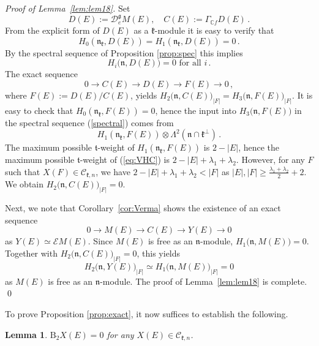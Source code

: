 \documentclass{tglat2e}
\newtheorem{lemma}[theorem]{Lemma}
\theoremstyle{definition}
\theoremstyle{remark}
\renewcommand{\tt}{\mathfrak{t}}
\newcommand{\kk}{\mathfrak{k}}
\newcommand{\nn}{\mathfrak{n}}
\renewcommand{\gg}{\mathfrak{g}}
\begin{document}
	\begin{proof}[Proof of Lemma~\ref{lem:lem18}] Set
$$D(E):=\mathcal D^\gg_e M(E),\quad C(E):=\Gamma_{\mathbb C  f}D(E)\,.$$
		From the explicit form of $D(E)$ as a $\kk$-module it is easy to verify that 
		\begin{equation*}
			H_0\left(\nn_\kk,D(E)\right)=H_1\left(\nn_\kk,D(E)\right)=0\,.
		\end{equation*}
		By the spectral sequence of Proposition \ref{prop:spec} this implies 
		\begin{equation*}
			H_i\big(\nn,D(E)\big)=0\text{ for all }i\,.
		\end{equation*}
		The exact sequence
		\begin{equation*}
			0\to C(E)\to D(E)\to F(E)\to 0\,,
		\end{equation*}
		where $F(E):=D(E)/C(E)$, yields $H_2\big(\nn,C(E)\big)_{|F|}=H_3\big(\nn,F(E)\big)_{|F|}$.  It is easy to check that $H_0\left(\nn_\kk,F(E)\right)=0$, hence the input 
into $H_3\big(\nn,F(E)\big)$ in the spectral sequence (\ref{spectral}) comes from 
		\begin{equation}
			H_1\left(\nn_\kk,F(E)\right)\otimes\Lambda^2\left(\nn\cap\kk^\perp\right)\,.
			\label{eq:VHC}
		\end{equation}
		The maximum possible $\tt$-weight of $H_1\left(\nn_\kk,F(E)\right)$ is $2-|E|$, hence the maximum possible $\tt$-weight of (\ref{eq:VHC}) is $2-|E|+\lambda_1+\lambda_2$.  However, for any $F$ such that $X(F)\in \mathcal{C}_{\kk,n}$, we have $2-|E|+\lambda_1+\lambda_2<|F|$ as $|E|,|F|\geq \frac{\lambda_1+\lambda_2}{2}+2$.  We obtain $H_2\big(\nn,C(E)\big)_{|F|}=0$.  
		
		Next, we note that Corollary~\ref{cor:Verma} shows the existence of an exact sequence
		$$0\to M(E)\to C(E)\to Y(E)\to 0$$
		as $Y(E)\simeq \mathcal{E}M(E)$.  Since $M(E)$ is free as an $\nn$-module, $H_1\big(\nn,M(E)\big)=0$.  Together with $H_2\big(\nn,C(E)\big)_{|F|}=0$, this yields
		\begin{equation*}
			H_2\big(\nn,Y(E)\big)_{|F|}\simeq H_1\big(\nn,M(E)\big)_{|F|}=0
		\end{equation*}
		as $M(E)$ is free as an $\nn$-module.  The proof of Lemma~\ref{lem:lem18} is complete.
	\qed\end{proof}

To prove Proposition \ref{prop:exact}, it now suffices to establish the following.	
	\begin{lemma}
		$\mathrm{B}_2X(E)=0$ for any $X(E)\in\mathcal{C}_{\kk,n}$.
		\label{lem:lem22}
	\end{lemma}
	
\end{document}

